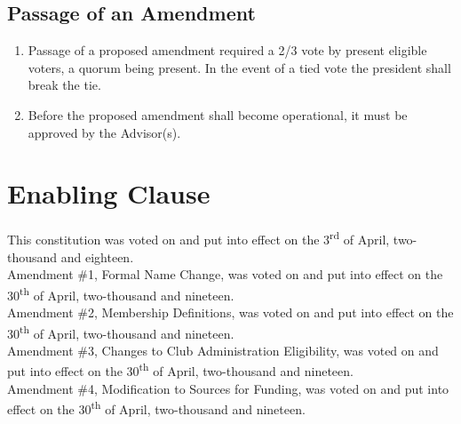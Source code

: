 \documentclass[english,11pt]{article}
\begin{document}
\subsection{Passage of an Amendment} \label{sect:amending:passage}
\begin{enumerate}[label=\Alph*.]
    \item Passage of a proposed amendment required a 2/3 vote by present eligible voters, a quorum being present.
        In the event of a tied vote the president shall break the tie.
    \item Before the proposed amendment shall become operational, it must be approved by the Advisor(s).
\end{enumerate}

\section{Enabling Clause} \label{art:enabling}
This constitution was voted on and put into effect on the 3\textsuperscript{rd} of April, two-thousand and eighteen. \\

\noindent Amendment \#1, Formal Name Change, was voted on and put into effect on the 30\textsuperscript{th} of April, two-thousand and nineteen. \\

\noindent Amendment \#2, Membership Definitions, was voted on and put into effect on the 30\textsuperscript{th} of April, two-thousand and nineteen. \\

\noindent Amendment \#3, Changes to Club Administration Eligibility, was voted on and put into effect on the 30\textsuperscript{th} of April, two-thousand and nineteen. \\

\noindent Amendment \#4, Modification to Sources for Funding, was voted on and put into effect on the 30\textsuperscript{th} of April, two-thousand and nineteen.
\end{document}
